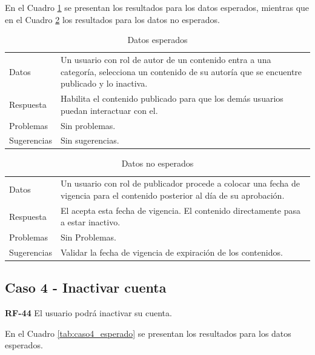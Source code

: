 \documentclass[10pt,times,twocolumn]{article}
\begin{document}
En el Cuadro \ref{tab:caso3_esperado} se presentan los resultados para los datos esperados, mientras que en el Cuadro \ref{tab:caso3_no_esperado} los resultados para los datos no esperados.

\begin{table}[H]
    \centering
    \begin{tabular}{p{3cm}p{4cm}}
        \rowcolor{gray!15}
        Datos & Un usuario con rol de autor de un contenido entra a una categoría, selecciona un contenido de su autoría que se encuentre publicado y lo inactiva.\\
       	Respuesta & Habilita el contenido publicado para que los demás usuarios puedan interactuar con el.\\
       	Problemas & Sin problemas.\\
       	Sugerencias & Sin sugerencias.\\
    \end{tabular}
    \caption{Datos esperados}
    \label{tab:caso3_esperado}
\end{table}

\begin{table}[H]
    \centering
    \begin{tabular}{p{3cm}p{4cm}}
        \rowcolor{gray!15}
        Datos & Un usuario con rol de publicador procede a colocar una fecha de vigencia para el contenido posterior al día de su aprobación.\\
        Respuesta & El acepta esta fecha de vigencia. El contenido directamente pasa a estar inactivo.\\
       	Problemas & Sin Problemas.\\
       	Sugerencias & Validar la fecha de vigencia de expiración de los contenidos.\\
    \end{tabular}
    \caption{Datos no esperados}
    \label{tab:caso3_no_esperado}
\end{table}

\subsection{Caso 4 - Inactivar cuenta}

\textbf{RF-44} El usuario podrá inactivar su cuenta.

En el Cuadro \ref{tab:caso4_esperado} se presentan los resultados para los datos esperados.
\end{document}
